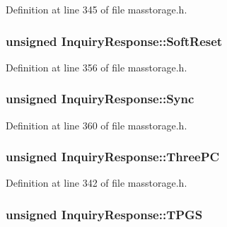 \-Definition at line 345 of file masstorage.\-h.

\hypertarget{struct_inquiry_response_ac912c8788475256de0bb7139e4a9f069}{
\subsubsection[{\-Soft\-Reset}]{\setlength{\rightskip}{0pt plus 5cm}unsigned {\bf \-Inquiry\-Response\-::\-Soft\-Reset}}}\label{struct_inquiry_response_ac912c8788475256de0bb7139e4a9f069}


\-Definition at line 356 of file masstorage.\-h.

\hypertarget{struct_inquiry_response_ac70c33310966b01936cd0c3ab7477c83}{
\subsubsection[{\-Sync}]{\setlength{\rightskip}{0pt plus 5cm}unsigned {\bf \-Inquiry\-Response\-::\-Sync}}}\label{struct_inquiry_response_ac70c33310966b01936cd0c3ab7477c83}


\-Definition at line 360 of file masstorage.\-h.

\hypertarget{struct_inquiry_response_a48b774030b80f98823e9b38aba8a625d}{
\subsubsection[{\-Three\-P\-C}]{\setlength{\rightskip}{0pt plus 5cm}unsigned {\bf \-Inquiry\-Response\-::\-Three\-P\-C}}}\label{struct_inquiry_response_a48b774030b80f98823e9b38aba8a625d}


\-Definition at line 342 of file masstorage.\-h.

\hypertarget{struct_inquiry_response_ada0ff6b78ecefa9b00bbe4e518ca4870}{
\subsubsection[{\-T\-P\-G\-S}]{\setlength{\rightskip}{0pt plus 5cm}unsigned {\bf \-Inquiry\-Response\-::\-T\-P\-G\-S}}}\label{struct_inquiry_response_ada0ff6b78ecefa9b00bbe4e518ca4870}


